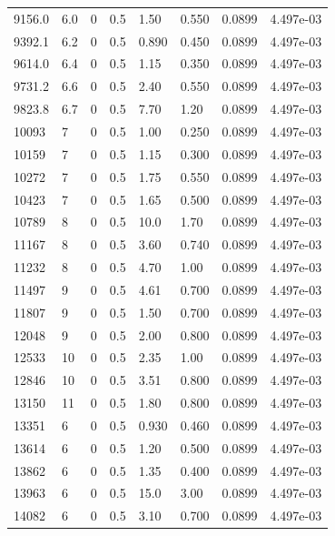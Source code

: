 \documentclass[preview]{standalone}
\begin{document}
{{{{\begin{tabular}{L{1.2cm}C{1.2cm} C{0.3cm}C{0.5cm} C{1.4cm}C{1.4cm} C{1.4cm}C{1.4cm}}
  9156.0  &   6.0  & 0     & 0.5 &  1.50  & 0.550  & 0.0899 &  4.497e-03   \\ 
  9392.1  &   6.2  & 0     & 0.5 &  0.890  & 0.450  & 0.0899 &  4.497e-03   \\ 
  9614.0  &   6.4  & 0     & 0.5 &  1.15  & 0.350  & 0.0899 &  4.497e-03   \\ 
  9731.2  &   6.6  & 0     & 0.5 &  2.40  & 0.550  & 0.0899 &  4.497e-03   \\ 
  9823.8  &   6.7  & 0     & 0.5 &  7.70  & 1.20  & 0.0899 &  4.497e-03   \\ 
  10093  &     7  & 0     & 0.5 &  1.00  & 0.250  & 0.0899 &  4.497e-03   \\ 
  10159  &     7  & 0     & 0.5 &  1.15  & 0.300  & 0.0899 &  4.497e-03   \\ 
  10272  &     7  & 0     & 0.5 &  1.75  & 0.550  & 0.0899 &  4.497e-03   \\ 
  10423  &     7  & 0     & 0.5 &  1.65  & 0.500  & 0.0899 &  4.497e-03   \\ 
  10789  &     8  & 0     & 0.5 &  10.0  & 1.70  & 0.0899 &  4.497e-03   \\ 
  11167  &     8  & 0     & 0.5 &  3.60  & 0.740  & 0.0899 &  4.497e-03   \\ 
  11232  &     8  & 0     & 0.5 &  4.70  & 1.00  & 0.0899 &  4.497e-03   \\ 
  11497  &     9  & 0     & 0.5 &  4.61  & 0.700  & 0.0899 &  4.497e-03   \\ 
  11807  &     9  & 0     & 0.5 &  1.50  & 0.700  & 0.0899 &  4.497e-03   \\ 
  12048  &     9  & 0     & 0.5 &  2.00  & 0.800  & 0.0899 &  4.497e-03   \\ 
  12533  &    10  & 0     & 0.5 &  2.35  & 1.00  & 0.0899 &  4.497e-03   \\ 
  12846  &    10  & 0     & 0.5 &  3.51  & 0.800  & 0.0899 &  4.497e-03   \\ 
  13150  &    11  & 0     & 0.5 &  1.80  & 0.800  & 0.0899 &  4.497e-03   \\ 
  13351  &     6  & 0     & 0.5 &  0.930  & 0.460  & 0.0899 &  4.497e-03   \\ 
  13614  &     6  & 0     & 0.5 &  1.20  & 0.500  & 0.0899 &  4.497e-03   \\ 
  13862  &     6  & 0     & 0.5 &  1.35  & 0.400  & 0.0899 &  4.497e-03   \\ 
  13963  &     6  & 0     & 0.5 &  15.0  & 3.00  & 0.0899 &  4.497e-03   \\ 
  14082  &     6  & 0     & 0.5 &  3.10  & 0.700  & 0.0899 &  4.497e-03   \\ 

\end{tabular}}}}}
\end{document}

